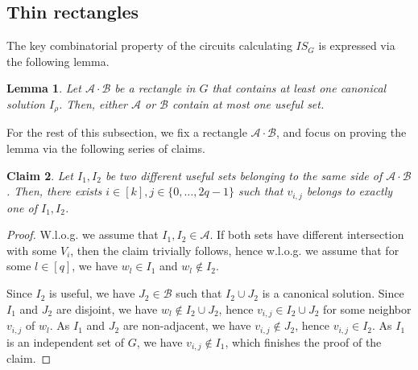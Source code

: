\documentclass[11pt,a4paper]{article}
\newtheorem{lemma}{Lemma}[section]
\newtheorem{claim}[lemma]{Claim}
\newcommand{\cA}{\mathcal{A}}
\newcommand{\cB}{\mathcal{B}}
\begin{document}
\subsection{Thin rectangles}

The key combinatorial property of the circuits calculating $IS_G$ is expressed via the following lemma.
\begin{lemma}\label{lem:is_thin_rects}
	Let $\cA \cdot \cB$ be a rectangle in $G$ that contains at least one canonical solution $I_\rho$. Then, either $\cA$ or $\cB$ contain at most one useful set.
\end{lemma}

For the rest of this subsection, we fix a rectangle $\cA \cdot \cB$, and focus on proving the lemma via the following series of claims.
\begin{claim}
    Let $I_1, I_2$ be two different useful sets belonging to the same side of $\cA \cdot \cB$. Then, there exists $i \in [k], j \in \{0, \dots, 2q - 1\}$ such that $v_{i, j}$ belongs to exactly one of $I_1, I_2$.
\end{claim}
\begin{proof}
    W.l.o.g. we assume that $I_1, I_2 \in \cA$. If both sets have different intersection with some $V_i$, then the claim trivially follows, hence w.l.o.g. we assume that for some $l \in [q]$, we have $w_l \in I_1$ and $w_l \not\in I_2$.
    
    Since $I_2$ is useful, we have $J_2 \in \cB$ such that $I_2 \cup J_2$ is a canonical solution. Since $I_1$ and $J_2$ are disjoint, we have $w_l \not\in I_2 \cup J_2$, hence $v_{i,j} \in I_2 \cup J_2$ for some neighbor $v_{i, j}$ of $w_l$. As $I_1$ and $J_2$ are non-adjacent, we have $v_{i,j} \not\in J_2$, hence $v_{i,j} \in I_2$. As $I_1$ is an independent set of $G$, we have $v_{i,j} \not\in I_1$, which finishes the proof of the claim.
\end{proof}
\end{document}
